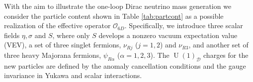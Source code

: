 \documentclass[12pt]{article}
\begin{document}
With the aim to illustrate the one-loop Dirac neutrino mass generation
we consider the particle content shown in Table \ref{tab:partcont} as
a possible realization of the effective operator $\mathcal{O}_{6D}$. Specifically, we introduce three scalar fields
$\eta, \sigma$ and $S$, where only $S$ develops a nonzero vacuum
expectation value (VEV),  a set of three singlet fermions,
$\nu_{Rj}$ ($j=1,2$) and $\nu_{R3}$, and another set of three heavy Majorana fermions, $\psi_{R\alpha}$ ($\alpha=1,2,3$).  
The $\operatorname{U}(1)_{\mathcal{D}}$ charges for the new particles are defined by the anomaly cancellation conditions and the gauge invariance in Yukawa and scalar interactions.
\end{document}
